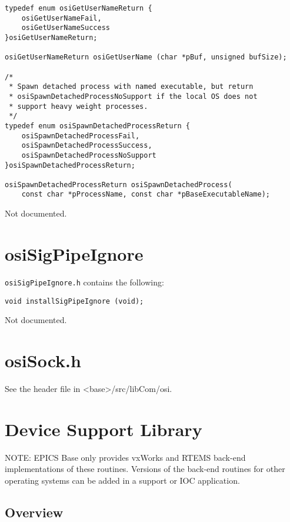 \begin{verbatim}typedef enum osiGetUserNameReturn {
    osiGetUserNameFail,
    osiGetUserNameSuccess
}osiGetUserNameReturn;

osiGetUserNameReturn osiGetUserName (char *pBuf, unsigned bufSize);

/*
 * Spawn detached process with named executable, but return
 * osiSpawnDetachedProcessNoSupport if the local OS does not
 * support heavy weight processes.
 */
typedef enum osiSpawnDetachedProcessReturn {
    osiSpawnDetachedProcessFail,
    osiSpawnDetachedProcessSuccess,
    osiSpawnDetachedProcessNoSupport
}osiSpawnDetachedProcessReturn;

osiSpawnDetachedProcessReturn osiSpawnDetachedProcess(
    const char *pProcessName, const char *pBaseExecutableName);

\end{verbatim}Not documented.

\section{osiSigPipeIgnore}

\verb|osiSigPipeIgnore.h| contains the following:

\begin{verbatim}void installSigPipeIgnore (void);
\end{verbatim}Not documented.

\section{osiSock.h}

See the header file in \textless{}base\textgreater{}/src/libCom/osi.

\section{ Device Support Library}

NOTE: EPICS Base only provides vxWorks and RTEMS back-end implementations of these routines. Versions of the 
back-end routines for other operating systems can be added in a support or IOC application.

\subsection{Overview}

